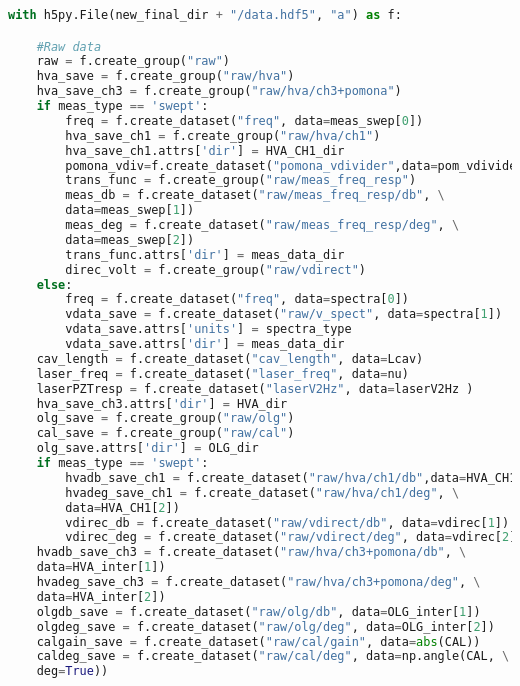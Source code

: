 \begin{lstlisting}[frame=single, language=Python]
with h5py.File(new_final_dir + "/data.hdf5", "a") as f:                      # Store raw / calibrated data along with metadata in data directory

    #Raw data
    raw = f.create_group("raw")
    hva_save = f.create_group("raw/hva")                                     # where hva data will be saved
    hva_save_ch3 = f.create_group("raw/hva/ch3+pomona")
    if meas_type == 'swept':
        freq = f.create_dataset("freq", data=meas_swep[0])                   # common frequency vector
        hva_save_ch1 = f.create_group("raw/hva/ch1")
        hva_save_ch1.attrs['dir'] = HVA_CH1_dir
        pomona_vdiv=f.create_dataset("pomona_vdivider",data=pom_vdivider)    # Voltage divider factor
        trans_func = f.create_group("raw/meas_freq_resp")
        meas_db = f.create_dataset("raw/meas_freq_resp/db", \
        data=meas_swep[1])
        meas_deg = f.create_dataset("raw/meas_freq_resp/deg", \
        data=meas_swep[2])
        trans_func.attrs['dir'] = meas_data_dir
        direc_volt = f.create_group("raw/vdirect")                           # the Vpk voltage and phase information of the signal directly sent to the electrodes
    else:
        freq = f.create_dataset("freq", data=spectra[0])                     # common frequency vector
        vdata_save = f.create_dataset("raw/v_spect", data=spectra[1])
        vdata_save.attrs['units'] = spectra_type
        vdata_save.attrs['dir'] = meas_data_dir                              # where error signal spectra will be saved
    cav_length = f.create_dataset("cav_length", data=Lcav)
    laser_freq = f.create_dataset("laser_freq", data=nu)
    laserPZTresp = f.create_dataset("laserV2Hz", data=laserV2Hz )
    hva_save_ch3.attrs['dir'] = HVA_dir
    olg_save = f.create_group("raw/olg")                                     # where olg data will be saved
    cal_save = f.create_group("raw/cal")                                     # easily accessible loop calibration factor data
    olg_save.attrs['dir'] = OLG_dir
    if meas_type == 'swept':
        hvadb_save_ch1 = f.create_dataset("raw/hva/ch1/db",data=HVA_CH1[1])
        hvadeg_save_ch1 = f.create_dataset("raw/hva/ch1/deg", \
        data=HVA_CH1[2])
        vdirec_db = f.create_dataset("raw/vdirect/db", data=vdirec[1])
        vdirec_deg = f.create_dataset("raw/vdirect/deg", data=vdirec[2])
    hvadb_save_ch3 = f.create_dataset("raw/hva/ch3+pomona/db", \
    data=HVA_inter[1])
    hvadeg_save_ch3 = f.create_dataset("raw/hva/ch3+pomona/deg", \
    data=HVA_inter[2])
    olgdb_save = f.create_dataset("raw/olg/db", data=OLG_inter[1])
    olgdeg_save = f.create_dataset("raw/olg/deg", data=OLG_inter[2])
    calgain_save = f.create_dataset("raw/cal/gain", data=abs(CAL))
    caldeg_save = f.create_dataset("raw/cal/deg", data=np.angle(CAL, \
    deg=True))



\end{lstlisting}
